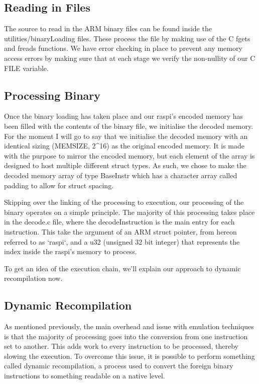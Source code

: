\documentclass[11pt]{article}
\begin{document}
\subsection{Reading in Files}

The source to read in the ARM binary files can be found inside the utilities/binaryLoading files. These process the file by making use of the C fgets and freads functions. We have error checking in place to prevent any memory access errors by making sure that at each stage we verify the non-nullity of our C FILE variable.

\subsection{Processing Binary}

Once the binary loading has taken place and our raspi's encoded memory has been filled with the contents of the binary file, we initialise the decoded memory. For the moment I will go to say that we initialise the decoded memory with an identical sizing (MEMSIZE, 2^16) as the original encoded memory. It is made with the purpose to mirror the encoded memory, but each element of the array is designed to host multiple different struct types. As such, we chose to make the decoded memory array of type BaseInstr which has a character array called padding to allow for struct spacing.

Skipping over the linking of the processing to execution, our processing of the binary operates on a simple principle. The majority of this processing takes place in the decode.c file, where the decodeInstruction is the main entry for each instruction. This take the argument of an ARM struct pointer, from hereon referred to as `raspi`, and a u32 (unsigned 32 bit integer) that represents the index inside the raspi's memory to process.

To get an idea of the execution chain, we'll explain our approach to dynamic recompilation now.

\subsection{Dynamic Recompilation}

As mentioned previously, the main overhead and issue with emulation techniques is that the majority of processing goes into the conversion from one instruction set to another. This adds work to every instruction to be processed, thereby slowing the execution. To overcome this issue, it is possible to perform something called dynamic recompilation, a process used to convert the foreign binary instructions to something readable on a native level.
\end{document}
